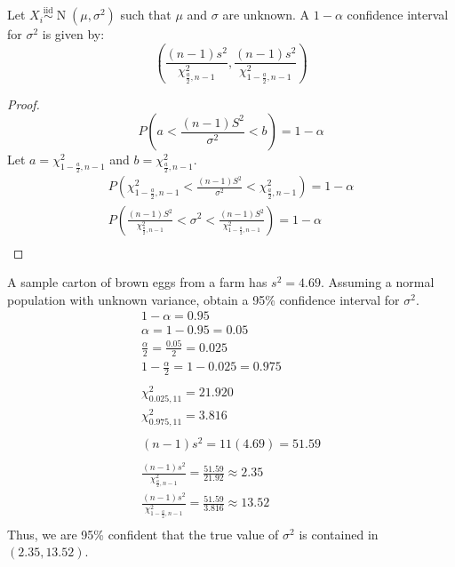 \documentclass[letterpaper,12pt,fleqn]{article}
\newcommand{\X}{\chi}
\newcommand{\Xs}{\X^2}
\newcommand{\xd}[2]{\Xs_{{#1},{#2}}}
\newcommand{\m}{\mu}
\renewcommand{\o}{\sigma}
\renewcommand{\a}{\alpha}
\newcommand{\iid}{\overset{\text{iid}}{\sim}}
\DeclareMathOperator{\nd}{N}
\begin{document}
\begin{theorem}
  Let \(X_i\iid\nd(\m,\o^2)\) such that \(\m\) and \(\o\) are unknown.  A \(1-\a\) confidence interval for \(\o^2\) is
  given by:
  \[\left(\frac{(n-1)s^2}{\xd{\frac{a}{2}}{n-1}},\frac{(n-1)s^2}{\xd{1-\frac{a}{2}}{n-1}}\right)\]
\end{theorem}

\begin{proof}
  \[P\left(a<\frac{(n-1)S^2}{\o^2}<b\right)=1-\a\]
  Let \(a=\xd{1-\frac{a}{2}}{n-1}\) and \(b=\xd{\frac{a}{2}}{n-1}\).
  \begin{gather*}
    P\left(\xd{1-\frac{a}{2}}{n-1}<\frac{(n-1)S^2}{\o^2}<\xd{\frac{a}{2}}{n-1}\right)=1-\a \\
    P\left(\frac{(n-1)S^2}{\xd{\frac{a}{2}}{n-1}}<\o^2<\frac{(n-1)S^2}{\xd{1-\frac{a}{2}}{n-1}}\right)=1-\a \\
  \end{gather*}
\end{proof}

\begin{example}
  A sample carton of brown eggs from a farm has \(s^2=4.69\).  Assuming a normal population with unknown variance, obtain a
  95\% confidence interval for \(\o^2\).
  \begin{gather*}
    1-\a=0.95 \\
    \a=1-0.95=0.05 \\
    \frac{\a}{2}=\frac{0.05}{2}=0.025 \\
    1-\frac{\a}{2}=1-0.025=0.975 \\
    \\
    \xd{0.025}{11}=21.920 \\
    \xd{0.975}{11}=3.816 \\
    \\
    (n-1)s^2=11(4.69)=51.59 \\
    \\
    \frac{(n-1)s^2}{\xd{\frac{a}{2}}{n-1}}=\frac{51.59}{21.92}\approx2.35 \\
    \frac{(n-1)s^2}{\xd{1-\frac{a}{2}}{n-1}}=\frac{51.59}{3.816}\approx13.52 \\
  \end{gather*}
  Thus, we are 95\% confident that the true value of \(\o^2\) is contained in \((2.35,13.52)\).
\end{example}
\end{document}
